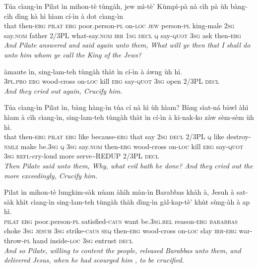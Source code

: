 \documentclass[11pt,a4paper]{article}
\begin{document}
\begin{exe}
\gll Túa cìang-ìn Pilat ìn mihon-tè tùngàh, jew mì-tè' Kùmpì-pà nà cìh pà ùh bàng-cìh dìng kà hì hìam cí-ìn à dot cìang-ìn \\
     that then-\textsc{erg} \textsc{pilat} \textsc{erg} poor.person-\textsc{pl} on-\textsc{loc} \textsc{jew} person-\textsc{pl} king-male \textsc{2sg} say.\textsc{nom} father 2/3PL what-say.\textsc{nom} \textsc{irr} \textsc{1sg} \textsc{decl} \textsc{q} say-\textsc{quot} \textsc{3sg} ask then-\textsc{erg} \\
\glt \textcolor{kjvcolor}{\textit{And Pilate answered and said again unto them, What will ye then that I shall do unto him whom ye call the King of the Jews?}}

\gll àmaute ìn, sing-lam-teh tùngàh thàt ìn cí-ìn à áwng ùh hì. \\
     \textsc{3pl}.\textsc{pro} \textsc{erg} wood-cross on-\textsc{loc} kill \textsc{erg} say-\textsc{quot} \textsc{3sg} open 2/3PL \textsc{decl} \\
\glt \textcolor{kjvcolor}{\textit{And they cried out again, Crucify him.}}

\gll Túa cìang-ìn Pilat ìn, bàng hàng-ìn túa cí nà hì ùh hìam? Bàng sìat-ná bāwl àhì hìam à cìh cìang-ìn, sing-lam-teh tùngàh thàt ìn cí-ìn à kī-nak-ko zàw sèm-sèm ùh hì. \\
     that then-\textsc{erg} \textsc{pilat} \textsc{erg} like because-\textsc{erg} that say \textsc{2sg} \textsc{decl} 2/3PL \textsc{q} like destroy-\textsc{nmlz} make be.\textsc{3sg} \textsc{q} \textsc{3sg} say.\textsc{nom} then-\textsc{erg} wood-cross on-\textsc{loc} kill \textsc{erg} say-\textsc{quot} \textsc{3sg} \textsc{refl}-cry-loud more serve\textasciitilde{}REDUP 2/3PL \textsc{decl} \\
\glt \textcolor{kjvcolor}{\textit{Then Pilate said unto them, Why, what evil hath he done? And they cried out the more exceedingly, Crucify him.}}

\gll Pilat ìn mihon-tè lungkim-sàk núam àhìh màn-ìn Barabbas khàh à, Jesuh à sat-sàk khìt cìang-ìn sing-lam-teh tùngàh thàh dìng-ìn gàl-kap-tè' khùt sùng-àh à ap hì. \\
     \textsc{pilat} \textsc{erg} poor.person-\textsc{pl} satisfied-\textsc{caus} want be.\textsc{3sg}.\textsc{rel} reason-\textsc{erg} \textsc{barabbas} choke \textsc{3sg} \textsc{jesuh} \textsc{3sg} strike-\textsc{caus} \textsc{seq} then-\textsc{erg} wood-cross on-\textsc{loc} slay \textsc{irr}-\textsc{erg} war-throw-\textsc{pl} hand inside-\textsc{loc} \textsc{3sg} entrust \textsc{decl} \\
\glt \textcolor{kjvcolor}{\textit{And so Pilate, willing to content the people, released Barabbas unto them, and delivered Jesus, when he had scourged him , to be crucified.}}


\end{exe}
\end{document}
